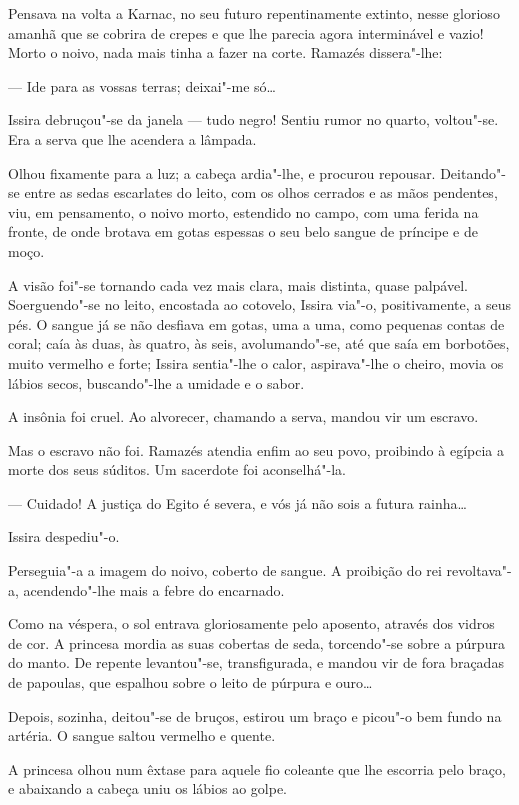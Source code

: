 Pensava na volta a Karnac, no seu futuro repentinamente extinto, nesse
glorioso amanhã que se cobrira de crepes e que lhe parecia agora
interminável e vazio! Morto o noivo, nada mais tinha a fazer na corte.
Ramazés dissera"-lhe:

--- Ide para as vossas terras; deixai"-me só\ldots{}

Issira debruçou"-se da janela --- tudo negro! Sentiu rumor no quarto,
voltou"-se. Era a serva que lhe acendera a lâmpada.

Olhou fixamente para a luz; a cabeça ardia"-lhe, e procurou repousar.
Deitando"-se entre as sedas escarlates do leito, com os olhos cerrados e
as mãos pendentes, viu, em pensamento, o noivo morto, estendido no
campo, com uma ferida na fronte, de onde brotava em gotas espessas o seu
belo sangue de príncipe e de moço.

A visão foi"-se tornando cada vez mais clara, mais distinta, quase
palpável. Soerguendo"-se no leito, encostada ao cotovelo, Issira via"-o,
positivamente, a seus pés. O sangue já se não desfiava em gotas, uma a
uma, como pequenas contas de coral; caía às duas, às quatro, às seis,
avolumando"-se, até que saía em borbotões, muito vermelho e forte; Issira
sentia"-lhe o calor, aspirava"-lhe o cheiro, movia os lábios secos,
buscando"-lhe a umidade e o sabor.

A insônia foi cruel. Ao alvorecer, chamando a serva, mandou vir um
escravo.

Mas o escravo não foi. Ramazés atendia enfim ao seu povo, proibindo à
egípcia a morte dos seus súditos. Um sacerdote foi aconselhá"-la.

--- Cuidado! A justiça do Egito é severa, e vós já não sois a futura
rainha\ldots{}

Issira despediu"-o.

Perseguia"-a a imagem do noivo, coberto de sangue. A proibição do rei
revoltava"-a, acendendo"-lhe mais a febre do encarnado.

Como na véspera, o sol entrava gloriosamente pelo aposento, através dos
vidros de cor. A princesa mordia as suas cobertas de seda, torcendo"-se
sobre a púrpura do manto. De repente levantou"-se, transfigurada, e
mandou vir de fora braçadas de papoulas, que espalhou sobre o leito de
púrpura e ouro\ldots{}

Depois, sozinha, deitou"-se de bruços, estirou um braço e picou"-o bem
fundo na artéria. O sangue saltou vermelho e quente.

A princesa olhou num êxtase para aquele fio coleante que lhe escorria
pelo braço, e abaixando a cabeça uniu os lábios ao golpe.

